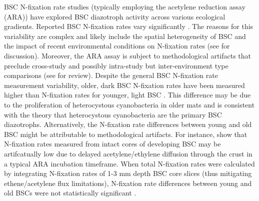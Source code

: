 BSC N-fixation rate studies (typically employing the acetylene reduction assay (ARA)) have explored BSC diazotroph activity across various ecological gradients. Reported BSC N-fixation rates vary significantly \cite{Evans_2001}. The reasons for this variability are complex and likely include the spatial heterogeneity of BSC \cite{Evans_2001} and the impact of recent environmental conditions on N-fixation rates (see \citet{Belnap_2001} for discussion). Moreover, the ARA assay is subject to methodological artifacts that preclude cross-study and possibly intra-study but inter-environment type comparisons (see \citet{Belnap_2001} for review). Despite the general BSC N-fixation rate measurement variability, older, dark BSC N-fixation rates have been measured higher than N-fixation rates for younger, light BSC \cite{Belnap_2002}. This difference may be due to the proliferation of heterocystous cyanobacteria in older mats and is consistent with the theory that heterocystous cyanobacteria are the primary BSC diazotrophs. Alternatively, the N-fixation rate differences between young and old BSC might be attributable to methodological artifacts. For instance, \citet{15643930} show that N-fixation rates measured from intact cores of developing BSC may be artifcatually low due to delayed acetylene/ethylene diffusion through the crust in a typical ARA incubation timeframe. When total N-fixation rates were calculated by integrating N-fixation rates of 1-3 mm depth BSC core slices (thus mitigating ethene/acetylene flux limitations), N-fixation rate differences between young and old BSCs were not statistically significant \cite{15643930}.

